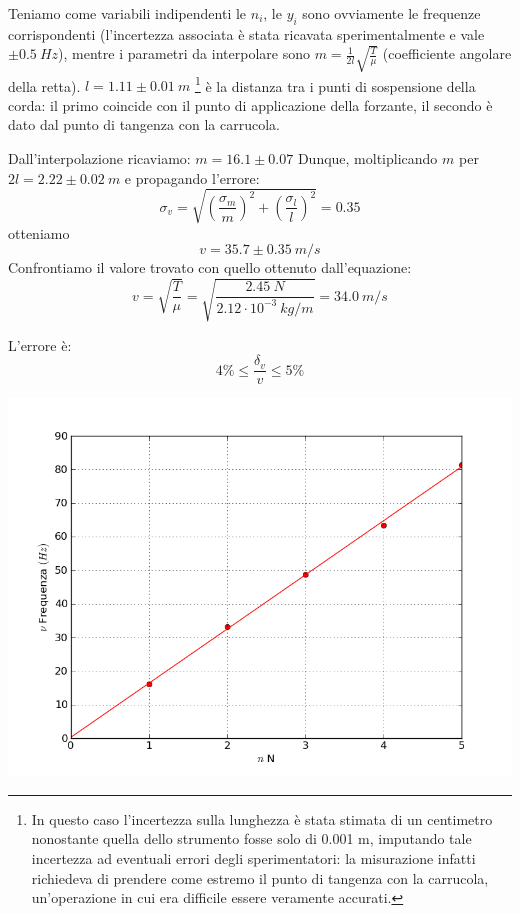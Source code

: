 Teniamo come variabili indipendenti le $n_i$, le $y_i$ sono ovviamente le frequenze corrispondenti (l'incertezza associata è stata ricavata sperimentalmente e vale $\pm0.5\ Hz$), mentre i parametri da interpolare sono $m=\frac{1}{2l}\sqrt{\frac{T}{\mu}}$ (coefficiente angolare della retta).
$l=1.11\pm0.01\ m$ \footnote{In questo caso l'incertezza sulla lunghezza è stata stimata di un centimetro nonostante quella dello strumento fosse solo di 0.001 m, imputando tale incertezza ad eventuali errori degli sperimentatori: la misurazione infatti richiedeva di prendere come estremo il punto di tangenza con la carrucola, un'operazione in cui era difficile essere veramente accurati.}
è la distanza tra i punti di sospensione della corda: il primo coincide con il punto di applicazione della forzante, il secondo è dato dal punto di tangenza con la carrucola.  

Dall'interpolazione ricaviamo: $m=16.1\pm0.07$ Dunque, moltiplicando $m$ per $2l=2.22\pm0.02\ m$ e propagando l'errore:
$$\sigma_v=\sqrt{\left(\frac{\sigma_m}{m}\right)^2+\left(\frac{\sigma_l}{l}\right)^2}=0.35$$
otteniamo $$v=35.7\pm0.35\ m/s$$ 
Confrontiamo il valore trovato con quello ottenuto dall'equazione:
$$v=\sqrt{\frac{T}{\mu}}=\sqrt{\frac{2.45\ N}{2.12 \cdot10^{-3}\ kg/m}}=34.0\ m/s$$

L'errore è:
$$4\% \leq \frac{\delta_v}{v} \leq 5\% $$






\begin{center}

\includegraphics[scale=0.5]{../grafici/corda_1armonica}
\end{center}




